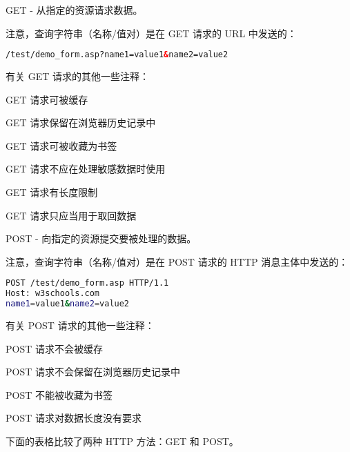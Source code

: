 \begin{compactitem}
\item GET - 从指定的资源请求数据。

注意，查询字符串（名称/值对）是在 GET 请求的 URL 中发送的：

\begin{lstlisting}[language=HTML]
    /test/demo_form.asp?name1=value1&name2=value2
\end{lstlisting}

有关 GET 请求的其他一些注释：

\begin{compactitem}
\item GET 请求可被缓存
\item GET 请求保留在浏览器历史记录中
\item GET 请求可被收藏为书签
\item GET 请求不应在处理敏感数据时使用
\item GET 请求有长度限制
\item GET 请求只应当用于取回数据
\end{compactitem}

\item POST - 向指定的资源提交要被处理的数据。

注意，查询字符串（名称/值对）是在 POST 请求的 HTTP 消息主体中发送的：

\begin{lstlisting}[language=bash]
POST /test/demo_form.asp HTTP/1.1
Host: w3schools.com
name1=value1&name2=value2
\end{lstlisting}

有关 POST 请求的其他一些注释：

\begin{compactitem}
\item POST 请求不会被缓存
\item POST 请求不会保留在浏览器历史记录中
\item POST 不能被收藏为书签
\item POST 请求对数据长度没有要求
\end{compactitem}


\end{compactitem}









下面的表格比较了两种 HTTP 方法：GET 和 POST。

